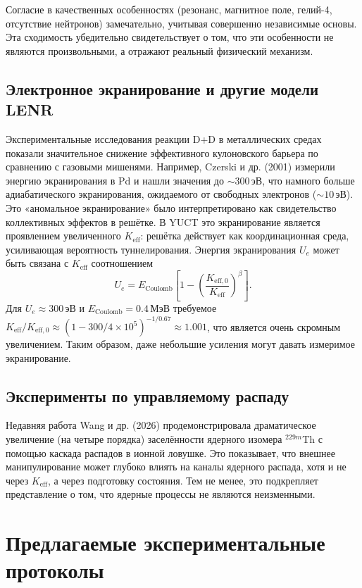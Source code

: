 \documentclass[12pt]{article}
\theoremstyle{remark}
\newcommand{\Keff}{K_{\mathrm{eff}}}
\newcommand{\Keffzero}{K_{\mathrm{eff},0}}
\begin{document}
	Согласие в качественных особенностях (резонанс, магнитное поле, гелий-4, отсутствие нейтронов) замечательно, учитывая совершенно независимые основы. Эта сходимость убедительно свидетельствует о том, что эти особенности не являются произвольными, а отражают реальный физический механизм.
	
	\subsection{Электронное экранирование и другие модели LENR}
	
	Экспериментальные исследования реакции D+D в металлических средах показали значительное снижение эффективного кулоновского барьера по сравнению с газовыми мишенями. Например, Czerski и др. (2001) измерили энергию экранирования в Pd и нашли значения до \(\sim 300\,\text{эВ}\), что намного больше адиабатического экранирования, ожидаемого от свободных электронов (\(\sim 10\,\text{эВ}\)). Это «аномальное экранирование» было интерпретировано как свидетельство коллективных эффектов в решётке. В YUCT это экранирование является проявлением увеличенного \(\Keff\): решётка действует как координационная среда, усиливающая вероятность туннелирования. Энергия экранирования \(U_e\) может быть связана с \(\Keff\) соотношением
	\begin{equation}
		U_e = E_{\text{Coulomb}} \left[1 - \left(\frac{\Keffzero}{\Keff}\right)^{\beta}\right].
	\end{equation}
	Для \(U_e \approx 300\,\text{эВ}\) и \(E_{\text{Coulomb}} = 0.4\,\text{МэВ}\) требуемое \(\Keff/\Keffzero \approx (1 - 300/4\times10^5)^{-1/0.67} \approx 1.001\), что является очень скромным увеличением. Таким образом, даже небольшие усиления могут давать измеримое экранирование.
	
	\subsection{Эксперименты по управляемому распаду}
	
	Недавняя работа Wang и др. (2026) продемонстрировала драматическое увеличение (на четыре порядка) заселённости ядерного изомера \(^{229m}\)Th с помощью каскада распадов в ионной ловушке. Это показывает, что внешнее манипулирование может глубоко влиять на каналы ядерного распада, хотя и не через \(\Keff\), а через подготовку состояния. Тем не менее, это подкрепляет представление о том, что ядерные процессы не являются неизменными.
	
	\section{Предлагаемые экспериментальные протоколы}
	\label{sec:experiments}
	
\end{document}
